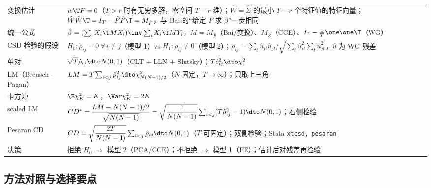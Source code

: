 \begin{center}
\begin{tabularx}{\linewidth}{>{\raggedright\arraybackslash}p{2.5cm}L}
变换估计 & $w\T F=0$（$T>r$ 时有无穷多解，零空间 $T-r$ 维）；$\hat W=\hat\Sigma$ 的最小 $T-r$ 个特征值的特征向量；$\hat W\hat W\T=I_T-\hat F\hat F\T=M_{\hat F}$，与 Bai 的“给定 $F$ 求 $\beta$”一步相同\\
统一公式 & $\hat\beta=(\sum_iX_i\T MX_i)\inv\sum_iX_i\T MY_i$，$M=M_{\hat F}$（Bai/变换）、$M_{\bar Z}$（CCE）、$I_T-\frac1T\one\one\T$（WG）\\
CSD 检验的假设 & $H_0:\rho_{ij}=0\ \forall\,i\neq j$（模型 1）vs $H_1:\rho_{ij}\neq0$（模型 2）；$\hat\rho_{ij}=\sum_t\hat u_{it}\hat u_{jt}/\sqrt{\sum_t\hat u_{it}^2\sum_t\hat u_{jt}^2}$，$\hat u$ 为 WG 残差\\
单对 & $\sqrt T\hat\rho_{ij}\dto N(0,1)$（CLT $+$ LLN $+$ Slutsky）；$T\hat\rho_{ij}^2\dto\chi^2_1$\\
LM（Breusch--Pagan） & $LM=T\sum_{i<j}\hat\rho_{ij}^2\dto\chi^2_{N(N-1)/2}$（$N$ 固定，$T\to\infty$）；只取上三角\\
卡方矩 & $\E\chi^2_K=K$，$\Var\chi^2_K=2K$\\
scaled LM & $CD^*=\dfrac{LM-N(N-1)/2}{\sqrt{N(N-1)}}=\sqrt{\dfrac1{N(N-1)}}\sum_{i<j}(T\hat\rho_{ij}^2-1)\dto N(0,1)$；右侧检验\\
Pesaran CD & $CD=\sqrt{\dfrac{2T}{N(N-1)}}\sum_{i<j}\hat\rho_{ij}\dto N(0,1)$（$T$ 可固定）；双侧检验；Stata \texttt{xtcsd, pesaran}\\
决策 & 拒绝 $H_0$ $\Rightarrow$ 模型 2（PCA/CCE）；不拒绝 $\Rightarrow$ 模型 1（FE）；估计后对残差再检验\\
\bottomrule
\end{tabularx}
\label{tab:U14b-core}
\end{center}

\subsection{方法对照与选择要点}

